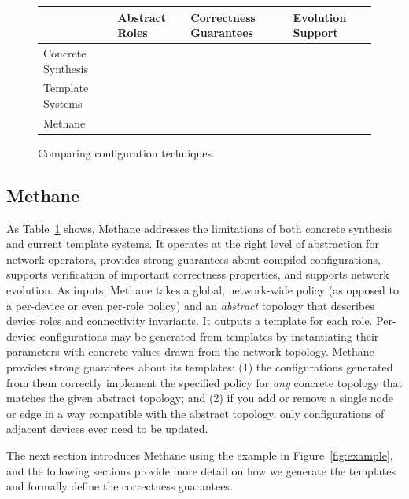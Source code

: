 \documentclass{sig-alternate-10pt}
\newcommand{\cmark}{\ding{51}}
\newcommand{\xmark}{\ding{55}}
\newcommand{\sysname}{{\small \sf Methane}\xspace}
\newcommand{\sysnamesec}{{\sf Methane}\xspace}
\begin{document}

\begin{figure}
\begin{tabular}{|p{0.6in}|p{0.6in}p{0.7in}p{0.6in}|} 
\hline
& Abstract Roles & Correctness Guarantees & Evolution Support  \\ \hline
Concrete Synthesis & \xmark & \cmark & \xmark \\ \hline
Template Systems & \cmark & \xmark & \xmark \\ \hline
\sysname & \cmark & \cmark & \cmark \\  \hline
\end{tabular}
\caption{Comparing configuration techniques.}
\label{fig:marketing}
\end{figure}


\subsection{\sysnamesec}

As Table~\ref{fig:marketing} shows, \sysname addresses the limitations of both concrete synthesis and current template systems. It operates at the right level of abstraction for network operators, provides strong guarantees about compiled configurations, supports verification of important correctness properties, and supports network evolution. As inputs, \sysname takes a global, network-wide policy (as opposed to a per-device or even per-role policy) and an 
{\em abstract} topology that describes device roles and 
connectivity invariants.  It outputs a template for each role.  Per-device configurations may be generated
from templates by instantiating their parameters with concrete values drawn from the network topology. 
\sysname provides strong guarantees about its templates: 
(1) the configurations generated from them correctly implement the specified policy for {\em any} concrete topology that matches the given abstract topology; and (2) if you add or remove a single node or edge in a way compatible
with the abstract topology, only configurations of adjacent devices ever need to be updated.

The next section introduces \sysname using the example in Figure~\ref{fig:example}, and the following sections provide more detail on how we generate the templates and formally define the correctness guarantees.
\end{document}
